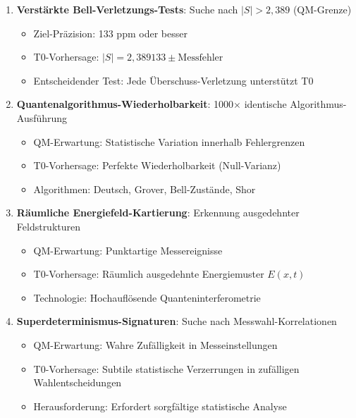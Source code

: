 \documentclass[12pt,a4paper]{article}
\begin{document}
\begin{enumerate}
	\item \textbf{Verstärkte Bell-Verletzungs-Tests}: Suche nach $|S| > 2,389$ (QM-Grenze)
	\begin{itemize}
		\item Ziel-Präzision: 133 ppm oder besser
		\item T0-Vorhersage: $|S| = 2,389133 \pm \text{Messfehler}$
		\item Entscheidender Test: Jede Überschuss-Verletzung unterstützt T0
	\end{itemize}
	
	\item \textbf{Quantenalgorithmus-Wiederholbarkeit}: 1000$\times$ identische Algorithmus-Ausführung
	\begin{itemize}
		\item QM-Erwartung: Statistische Variation innerhalb Fehlergrenzen
		\item T0-Vorhersage: Perfekte Wiederholbarkeit (Null-Varianz)
		\item Algorithmen: Deutsch, Grover, Bell-Zustände, Shor
	\end{itemize}
	
	\item \textbf{Räumliche Energiefeld-Kartierung}: Erkennung ausgedehnter Feldstrukturen
	\begin{itemize}
		\item QM-Erwartung: Punktartige Messereignisse
		\item T0-Vorhersage: Räumlich ausgedehnte Energiemuster $E(x,t)$
		\item Technologie: Hochauflösende Quanteninterferometrie
	\end{itemize}
	
	\item \textbf{Superdeterminismus-Signaturen}: Suche nach Messwahl-Korrelationen
	\begin{itemize}
		\item QM-Erwartung: Wahre Zufälligkeit in Messeinstellungen
		\item T0-Vorhersage: Subtile statistische Verzerrungen in zufälligen Wahlentscheidungen
		\item Herausforderung: Erfordert sorgfältige statistische Analyse
	\end{itemize}
\end{enumerate}
			
\end{document}

